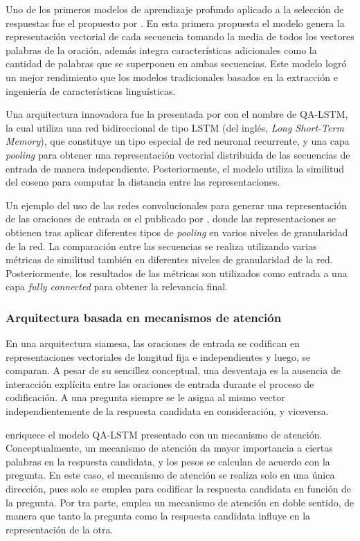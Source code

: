 Uno de los primeros modelos de aprendizaje profundo aplicado a la selección de respuestas fue el propuesto por \cite{2014-yu-answer-sentence}. En esta primera propuesta el modelo genera la representación vectorial de cada secuencia tomando la media de todos los vectores palabras de la oración, además integra características adicionales como la cantidad de palabras que se superponen en ambas secuencias. Este modelo logró un mejor rendimiento que los modelos tradicionales basados en la extracción e ingeniería de características linguísticas.

Una arquitectura innovadora fue la presentada por \cite{2015-tan-qalstm} con el nombre de QA-LSTM, la cual utiliza una red bidireccional de tipo LSTM (del inglés, \textit{Long Short-Term Memory}), que constituye un tipo especial de red neuronal recurrente, y una capa \textit{pooling} para obtener una representación vectorial distribuida de las secuencias de entrada de manera independiente. Posteriormente, el modelo utiliza la similitud del coseno para computar la distancia entre las representaciones. 

Un ejemplo del uso de las redes convolucionales para generar una representación de las oraciones de entrada es el publicado por \cite{2015-moschitti-cnn}, donde las representaciones se obtienen tras aplicar diferentes tipos de \textit{pooling} en varios niveles de granularidad de la red. La comparación entre las secuencias se realiza utilizando varias métricas de similitud también en diferentes niveles de granularidad de la red. Posteriormente, los resultados de las métricas son utilizados como entrada a una capa \textit{fully connected} para obtener la relevancia final. 

\subsubsection{Arquitectura basada en mecanismos de atención}

En una arquitectura siamesa, las oraciones de entrada se codifican en representaciones vectoriales de longitud fija e independientes y luego, se comparan. A pesar de su sencillez conceptual, una desventaja es la ausencia de interacción explícita entre las oraciones de entrada durante el proceso de codificación. A una pregunta siempre se le asigna al mismo vector independientemente de la respuesta candidata en consideración, y viceversa. 

\cite{2015-tan-qalstm} enriquece el modelo QA-LSTM presentado con un mecanismo de atención. 
Conceptualmente, un mecanismo de atención da mayor importancia a ciertas palabras en la respuesta candidata, y los pesos se calculan de acuerdo con la pregunta. En este caso, el mecanismo de atención se realiza solo en una única dirección, pues solo se emplea para codificar la respuesta candidata en función de la pregunta. Por tra parte, \cite{2016-santos-attentive} emplea un mecanismo de atención en doble sentido, de manera que tanto la pregunta como la respuesta candidata influye en la representación de la otra.  

